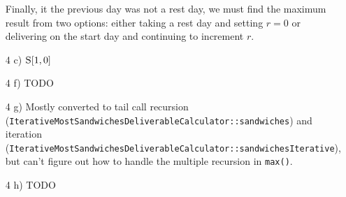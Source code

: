 \documentclass[]{article}
\begin{document}
\begin{itemize}
	Finally, it the previous day was not a rest day, we must find the maximum result from two options: either taking a rest day and setting $r=0$ or delivering on the start day and continuing to increment $r$.
	
	\item [4 c)] $\textsc{S}[1, 0]$
	
	\item [4 f)] TODO
	
	\item [4 g)] Mostly converted to tail call recursion (\texttt{IterativeMostSandwichesDeliverableCalculator::sandwiches}) and iteration (\texttt{IterativeMostSandwichesDeliverableCalculator::sandwichesIterative}), but can't figure out how to handle the multiple recursion in \texttt{max()}.
	
	\item [4 h)] TODO
	
\end{itemize}
\end{document}
